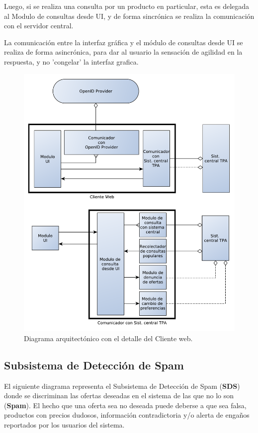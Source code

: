 Luego, si se realiza una consulta por un producto en particular, esta es delegada al \textsf{Modulo de consultas desde UI}, y de forma sincrónica se realiza la comunicación con el servidor central.

La comunicación entre la interfaz gráfica y el módulo de consultas desde UI se realiza de forma asincrónica, para dar al usuario la sensación de agilidad en la respuesta, y no 'congelar' la interfaz grafica.

\begin{figure}[H]
	\centering
	\includegraphics[width=\textwidth]{graficos/arch/Cliente_web.pdf}
	\caption{Diagrama arquitectónico con el detalle del \textsf{Cliente web}.}
\end{figure}


\subsection{Subsistema de Detección de Spam}

El siguiente diagrama representa el Subsistema de Detección de Spam (\textbf{SDS}) donde se discriminan las ofertas deseadas en el sistema de las que no lo son (\textbf{Spam}). El hecho que una oferta sea no deseada puede deberse a que sea falsa, productos con precios dudosos, información contradictoria y/o alerta de enga\~{n}os reportados por los usuarios del sistema.

